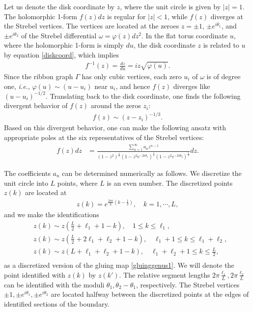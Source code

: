\documentclass[12pt]{article}
\def\ie{\begin{equation}\begin{aligned}}
\def\fe{\end{aligned}\end{equation}}
\numberwithin{equation}{section}
\begin{document}
Let us denote the disk coordinate by $z$, where the unit circle is given by $|z|=1$. The holomorphic 1-form $f(z)dz$ is regular for $|z|<1$, while $f(z)$ diverges at the Strebel vertices. The vertices are located at the zeroes $z=\pm 1$, $\pm e^{i\theta_1}$, and $\pm e^{i\theta_2}$ of the Strebel differential $\omega = \varphi(z)dz^2$. In the flat torus coordinate $u$, where the holomorphic 1-form is simply $du$, the disk coordinate $z$ is related to $u$ by equation \eqref{diskcoord}, which implies
\ie
f^{-1}(z) = \frac{dz}{du} = iz\sqrt{\varphi(u)}.
\fe
Since the ribbon graph $\Gamma$ has only cubic vertices, each zero $u_i$ of $\omega$ is of degree one, \textit{i.e.}, $\varphi(u)\sim (u-u_i)$ near $u_i$, and hence $f(z)$ diverges like $(u-u_i)^{-1/2}$. Translating back to the disk coordinate, one finds the following divergent behavior of $f(z)$ around the zeros $z_i$:
\ie
f(z) \sim (z-z_i)^{-1/3}.
\fe
Based on this divergent behavior, one can make the following ansatz with appropriate poles at the six representatives of the Strebel vertices:
\ie\label{fzoneform}
f(z) dz &= \frac{\sum_{n=1}^\infty a_n z^{n-1}}{(1-z^2)^{\frac13} (1-z^2 e^{-2 i \theta_1})^{\frac13} (1-z^2 e^{-2i \theta_2})^{\frac13}} dz.
\fe

The coefficients $a_n$ can be determined numerically as follows. We discretize the unit circle into $L$ points, where $L$ is an even number. The discretized points $z(k)$ are located at
\ie\label{zkposition}
z(k) = e^{\frac{2\pi i}{L}(k-\frac{1}{2})},\quad k=1,\cdots, L,
\fe
and we make the identifications
\ie
&z(k) \sim z(\tfrac{L}{2}+\ell_1+1-k),\quad 1\leq k \leq \ell_1,\\
&z(k) \sim z(\tfrac{L}{2}+2\ell_1+\ell_2+1-k),\quad \ell_1+1 \leq k \leq \ell_1+\ell_2,\\
&z(k) \sim z(L+\ell_1+\ell_2+1-k),\quad \ell_1+\ell_2+1\leq k \leq \tfrac{L}{2},\\
\fe
as a discretized version of the gluing map \eqref{gluinggenus1}. We will denote the point identified with $z(k)$ by $z(k')$. The relative segment lengths %
$2\pi\tfrac{\ell_1}{L}, 2\pi\tfrac{\ell_2}{L}$ can be identified with the moduli $\theta_1, \theta_2-\theta_1$, respectively. The Strebel vertices $\pm 1,\pm e^{i\theta_1}, \pm e^{i\theta_2}$ are located halfway between the discretized points at the edges of identified sections of the boundary.
\end{document}
